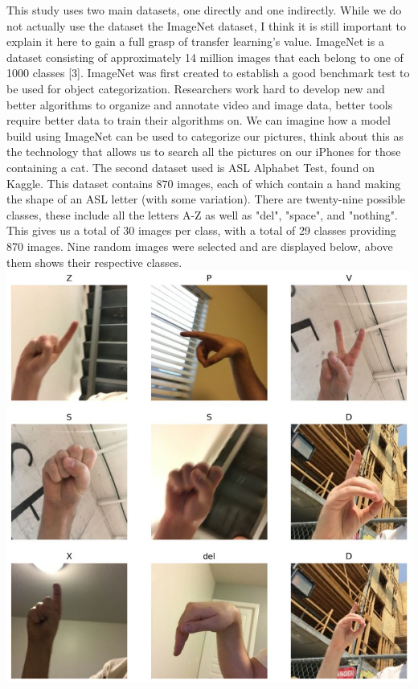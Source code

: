 \documentclass[12pt]{article}
\begin{document}
This study uses two main datasets, one directly and one indirectly. While we do not actually use the dataset the ImageNet dataset, I think it is still important to explain it here to gain a full grasp of 
transfer learning's value. ImageNet is a dataset consisting of approximately 14 million images that each belong to one of 1000 classes [3]. ImageNet was first created to establish a good benchmark test
to be used for object categorization. Researchers work hard to develop new and better algorithms to organize and annotate video and image data, better tools require better data to train their algorithms on.
We can imagine how a model build using ImageNet can be used to categorize our pictures, think about this as the technology that allows us to search all the pictures on our iPhones for those containing a cat. 
The second dataset used is ASL Alphabet Test, found on Kaggle. This dataset contains 870 images, each of which contain a hand making the shape of an ASL letter (with some variation). There are
twenty-nine possible classes, these include all the letters A-Z as well as "del", "space", and "nothing". This gives us a total of 30 images per class, with a total of 29 classes providing 870 images.
Nine random images were selected and are displayed below, above them shows their respective classes.\\
\includegraphics*[scale=0.25]{images/example_from_dataset.JPG} \\
\end{document}
